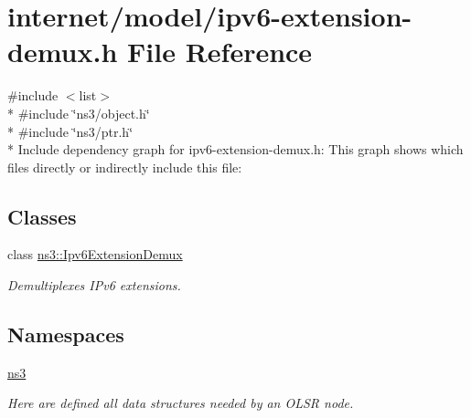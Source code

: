 \hypertarget{ipv6-extension-demux_8h}{}\section{internet/model/ipv6-\/extension-\/demux.h File Reference}
\label{ipv6-extension-demux_8h}
{\ttfamily \#include $<$list$>$}\\*
{\ttfamily \#include \char`\"{}ns3/object.\+h\char`\"{}}\\*
{\ttfamily \#include \char`\"{}ns3/ptr.\+h\char`\"{}}\\*
Include dependency graph for ipv6-\/extension-\/demux.h\+:
This graph shows which files directly or indirectly include this file\+:
\subsection*{Classes}
\begin{DoxyCompactItemize}
\item 
class \hyperlink{classns3_1_1Ipv6ExtensionDemux}{ns3\+::\+Ipv6\+Extension\+Demux}
\begin{DoxyCompactList}\small\item\em Demultiplexes I\+Pv6 extensions. \end{DoxyCompactList}\end{DoxyCompactItemize}
\subsection*{Namespaces}
\begin{DoxyCompactItemize}
\item 
 \hyperlink{namespacens3}{ns3}
\begin{DoxyCompactList}\small\item\em Here are defined all data structures needed by an O\+L\+SR node. \end{DoxyCompactList}\end{DoxyCompactItemize}
